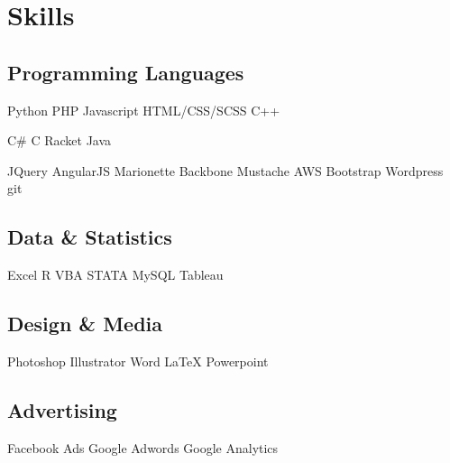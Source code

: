 \section{Skills}
\subsection{Programming Languages}

Python \textbullet{} PHP \textbullet{} Javascript \textbullet{} HTML/CSS/SCSS \textbullet{} C++ \\
\sectionsep

C\# \textbullet{} C \textbullet{} Racket \textbullet{} Java
\sectionsep

JQuery \textbullet{} AngularJS \textbullet{} Marionette \textbullet{} Backbone \textbullet{} Mustache \textbullet{} AWS \textbullet{} Bootstrap \textbullet{} Wordpress \textbullet{} git
\sectionsep

\subsection{Data \& Statistics}
Excel \textbullet{} R \textbullet{} VBA \textbullet{} STATA \textbullet{} MySQL \textbullet{} Tableau\\
\sectionsep

\subsection{Design \& Media}
Photoshop \textbullet{} Illustrator \textbullet{} Word \textbullet{} LaTeX \textbullet{} Powerpoint \\
\sectionsep

\subsection{Advertising}
Facebook Ads \textbullet{} Google Adwords \textbullet{} Google Analytics \\
\sectionsep
